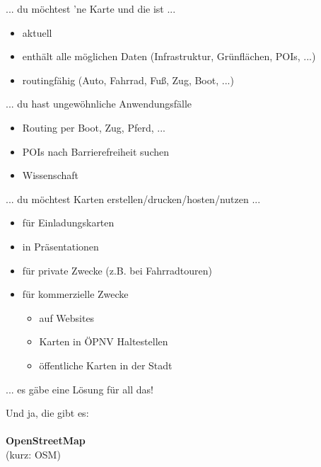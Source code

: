 \documentclass{beamer}
\begin{document}
			\begin{frame}{... du möchtest 'ne Karte und die ist ...}
				\begin{itemize}
					\item aktuell\pause
					\item enthält alle möglichen Daten (Infrastruktur, Grünflächen, POIs, ...)\pause
					\item routingfähig (Auto, Fahrrad, Fuß, Zug, Boot, ...)
				\end{itemize}
			\end{frame}
		
			\begin{frame}{... du hast ungewöhnliche Anwendungsfälle}
				\begin{itemize}
					\item Routing per Boot, Zug, Pferd, ...
					\item POIs nach Barrierefreiheit suchen
					\item Wissenschaft
				\end{itemize}
			\end{frame}
		
			\begin{frame}{... du möchtest Karten erstellen/drucken/hosten/nutzen ...}
				\begin{itemize}
					\item für Einladungskarten
					\item in Präsentationen
					\item für private Zwecke (z.B. bei Fahrradtouren)
					\item für kommerzielle Zwecke
					\begin{itemize}
						\item auf Websites
						\item Karten in ÖPNV Haltestellen
						\item öffentliche Karten in der Stadt
					\end{itemize}
				\end{itemize}
			\end{frame}
		
			\begin{frame}{... es gäbe eine Lösung für all das!}
				\begin{center}
					Und ja, die gibt es:\\
					\hfill\\
					\textbf{OpenStreetMap}\\
					{\tiny (kurz: OSM)}
				\end{center}
			\end{frame}
\end{document}
